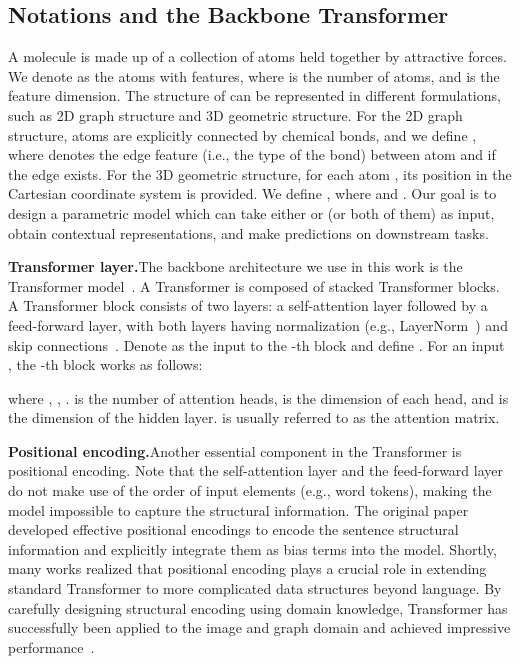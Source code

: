 \documentclass{article} \usepackage[dvipsnames]{xcolor}
\begin{document}
\vspace{-8pt}
\subsection{Notations and the Backbone Transformer}
\label{sec-notations}
\vspace{-2pt}
A molecule  is made up of a collection of atoms held together by attractive forces. We denote  as the atoms with features, where  is the number of atoms, and  is the feature dimension. The structure of  can be represented in different formulations, such as 2D graph structure and 3D geometric structure. For the 2D graph structure, atoms are explicitly connected by chemical bonds, and we define , where  denotes the edge feature (i.e., the type of the bond) between atom  and  if the edge exists. For the 3D geometric structure, for each atom , its position  in the Cartesian coordinate system is provided. We define , where  and . Our goal is to design a parametric model which can take either  or  (or both of them) as input, obtain contextual representations, and make predictions on downstream tasks. 

\textbf{Transformer layer.}\quad The backbone architecture we use in this work is the Transformer model~\citep{vaswani2017attention}. A Transformer is composed of stacked Transformer blocks. A Transformer block consists of two layers: a self-attention layer followed by a feed-forward layer, with both layers having normalization (e.g., LayerNorm~\citep{ba2016layer}) and skip connections~\citep{he2016deep}. Denote  as the input to the -th block and define . For an input , the -th block works as follows:





where , , .  is the number of attention heads,  is the dimension of each head, and  is the dimension of the hidden layer.  is usually referred to as the attention matrix.

\textbf{Positional encoding.}\quad Another essential component in the Transformer is positional encoding. Note that the self-attention layer and the feed-forward layer do not make use of the order of input elements (e.g., word tokens), making the model impossible to capture the structural information. The original paper~\citep{vaswani2017attention} developed effective positional encodings to encode the sentence structural information and explicitly integrate them as bias terms into the model. Shortly, many works realized that positional encoding plays a crucial role in extending standard Transformer to more complicated data structures beyond language. By carefully designing structural encoding using domain knowledge, Transformer has successfully been applied to the image and graph domain and achieved impressive performance~\citep{dosovitskiy2020image,liu2021Swin,ying2021transformers}.    
\end{document}
